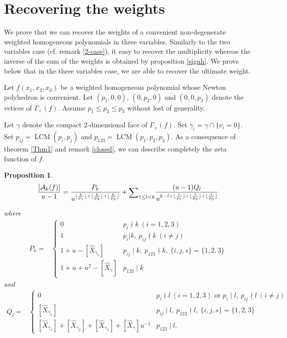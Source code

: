 \documentclass[12pt,a4paper,leqno]{amsart}
\newtheorem{prop}[thm]{Proposition}
\theoremstyle{definition}
\begin{document}
\section{Recovering the weights}\label{reco}

We prove that we can recover the weights of a convenient non-degenerate weighted
homogeneous polynomials in three variables. Similarly to the two
variables case (cf. remark \ref{2-case}), it easy to recover the multiplicity whereas the
inverse of the sum of the weights is obtained by proposition
\ref{signh}. We prove below that in the three variables case, we are
able to recover the ultimate weight.

Let $f(x_1,x_2,x_3)$ be a weighted homogeneous polynomial whose Newton polyhedron is convenient.
Let $(p_1,0,0)$, $(0,p_2,0)$ and $(0,0,p_3)$ denote the vetices  of
$\Gamma_+(f)$. Assume $p_1 \leq p_2 \leq p_3$ without lost of
generality.

Let $\gamma$ denote the compact 2-dimensional face of $\Gamma_+(f)$.
Set $\gamma_i=\gamma\cap\{\nu_i=0\}$. 
Set $p_{ij}={\mathop{\mathrm{LCM}}\nolimits}(p_i,p_j)$ and $p_{123}={\mathop{\mathrm{LCM}}\nolimits}(p_1,p_2,p_3)$. As a
consequence of theorem \ref{Thm1} and remark \ref{closed}, we can
describe completely the zeta function of $f$.
\begin{prop}
$$
\frac{[\mathcal A_k(f)]}{u-1}
=
\frac{P_k}
{u^{
\lfloor\frac{k}{p_1}\rfloor
+\lfloor\frac{k}{p_2}\rfloor
+\lfloor\frac{k}{p_3}\rfloor}
}
+
{\mathop{\textrm{\scriptsize $\mathop\sum$}}}_{1\le l<k}
\frac{(u-1)Q_l}
{u^{k-l
+\lfloor\frac{l}{p_1}\rfloor
+\lfloor\frac{l}{p_2}\rfloor
+\lfloor\frac{l}{p_3}\rfloor
}}
$$

where 
\begin{align*}
P_k=&
\begin{cases}
0&p_i\nmid k\ (i=1,2,3)\\
1&p_i|k,\ p_{ij}\nmid k\ (i\ne j)\\
1+u-[\widehat{X}_{\gamma_s}]&p_{ij}\mid k, \ p_{123} \nmid k, \ \{i,j,s\}=\{1,2,3\}\\
1+u+u^2-[\overline{\widehat{X}_{\gamma}}]&p_{123}\mid k
\end{cases}
\end{align*}
and
\begin{align*}
Q_l=&
\begin{cases}
0 & p_i\nmid l\ (i=1,2,3) \textrm{ or }p_i\mid l,\ p_{ij}\nmid l\ (i\ne j)\\
[\widehat{X}_{\gamma_s}]&p_{ij}\mid l, \ p_{123} \nmid l, \ \{i,j,s\}=\{1,2,3\}\\
[\widehat{X}_{\gamma_1}]
+[\widehat{X}_{\gamma_2}]
+[\widehat{X}_{\gamma_3}]
+[\widehat{X}_{\gamma}]u^{-1}&p_{123}\mid l .
\end{cases}
\end{align*}
\end{prop}
\end{document}
